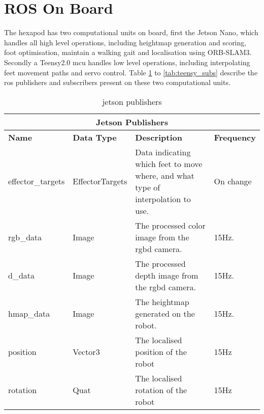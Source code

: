     \section{ROS On Board} \label{sec:on_board_ros}
    The hexapod has two computational units on board, first the Jetson Nano, which handles all high level operations, including heightmap generation and scoring,
    foot optimisation, maintain a walking gait and localisation using ORB-SLAM3. Secondly a Teensy2.0 \ac{mcu} handles low level operations, including interpolating feet movement paths
    and servo control. Table \ref{tab:jetson_pubs} to \ref{tab:teensy_subs} describe the \ac{ros} publishers and subscribers present on these two computational units.
    \begin{table}[h]
        \centering
        \begin{tabularx}{\textwidth}{| l | l | X | l |}
            \hline
            \multicolumn{4}{|c|}{\textbf{Jetson Publishers}} \\ \hline
            \textbf{Name} & \textbf{Data Type} & \textbf{Description} & \textbf{Frequency} \\ \hline
            effector\_targets & EffectorTargets & Data indicating which feet to move where, and what type of interpolation to use. & On change\\ \hline
            rgb\_data & Image & The processed color image from the \ac{rgbd} camera. & 15Hz. \\ \hline
            d\_data & Image & The processed depth image from the \ac{rgbd} camera. & 15Hz. \\ \hline
            hmap\_data & Image & The heightmap generated on the robot. & 15Hz. \\ \hline
            position & Vector3 & The localised position of the robot & 15Hz \\ \hline
            rotation & Quat & The localised rotation of the robot & 15Hz \\ \hline
        \end{tabularx}
        \caption{jetson publishers}
        \label{tab:jetson_pubs}
    \end{table}

